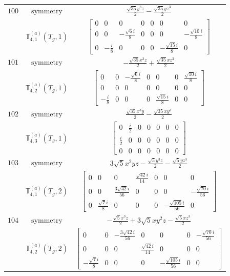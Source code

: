 \documentclass[fleqn,8pt,landscape]{jsarticle}
\begin{document}
\begin{longtable}{ccc}
$ 100 $ & $ \text{symmetry} $ & $ \frac{\sqrt{35} y^{3} z}{2} - \frac{\sqrt{35} y z^{3}}{2} $ \\
$  $ & $ \mathbb{T}_{4,1}^{(a)}(T_{g},1) $ & $ \begin{bmatrix} 0 & 0 & 0 & 0 & 0 & 0 & 0 \\ 0 & 0 & - \frac{\sqrt{6} i}{8} & 0 & 0 & 0 & - \frac{\sqrt{10} i}{8} \\ 0 & - \frac{i}{8} & 0 & 0 & 0 & - \frac{\sqrt{15} i}{8} & 0 \end{bmatrix} $ \\ \hline
$ 101 $ & $ \text{symmetry} $ & $ - \frac{\sqrt{35} x^{3} z}{2} + \frac{\sqrt{35} x z^{3}}{2} $ \\
$  $ & $ \mathbb{T}_{4,2}^{(a)}(T_{g},1) $ & $ \begin{bmatrix} 0 & 0 & - \frac{\sqrt{6} i}{8} & 0 & 0 & 0 & \frac{\sqrt{10} i}{8} \\ 0 & 0 & 0 & 0 & 0 & 0 & 0 \\ - \frac{i}{8} & 0 & 0 & 0 & \frac{\sqrt{15} i}{8} & 0 & 0 \end{bmatrix} $ \\ \hline
$ 102 $ & $ \text{symmetry} $ & $ \frac{\sqrt{35} x^{3} y}{2} - \frac{\sqrt{35} x y^{3}}{2} $ \\
$  $ & $ \mathbb{T}_{4,3}^{(a)}(T_{g},1) $ & $ \begin{bmatrix} 0 & \frac{i}{2} & 0 & 0 & 0 & 0 & 0 \\ \frac{i}{2} & 0 & 0 & 0 & 0 & 0 & 0 \\ 0 & 0 & 0 & 0 & 0 & 0 & 0 \end{bmatrix} $ \\ \hline
$ 103 $ & $ \text{symmetry} $ & $ 3 \sqrt{5} x^{2} y z - \frac{\sqrt{5} y^{3} z}{2} - \frac{\sqrt{5} y z^{3}}{2} $ \\
$  $ & $ \mathbb{T}_{4,1}^{(a)}(T_{g},2) $ & $ \begin{bmatrix} 0 & 0 & 0 & \frac{\sqrt{42} i}{14} & 0 & 0 & 0 \\ 0 & 0 & \frac{3 \sqrt{42} i}{56} & 0 & 0 & 0 & - \frac{\sqrt{70} i}{56} \\ 0 & \frac{\sqrt{7} i}{8} & 0 & 0 & 0 & - \frac{\sqrt{105} i}{56} & 0 \end{bmatrix} $ \\ \hline
$ 104 $ & $ \text{symmetry} $ & $ - \frac{\sqrt{5} x^{3} z}{2} + 3 \sqrt{5} x y^{2} z - \frac{\sqrt{5} x z^{3}}{2} $ \\
$  $ & $ \mathbb{T}_{4,2}^{(a)}(T_{g},2) $ & $ \begin{bmatrix} 0 & 0 & - \frac{3 \sqrt{42} i}{56} & 0 & 0 & 0 & - \frac{\sqrt{70} i}{56} \\ 0 & 0 & 0 & \frac{\sqrt{42} i}{14} & 0 & 0 & 0 \\ - \frac{\sqrt{7} i}{8} & 0 & 0 & 0 & - \frac{\sqrt{105} i}{56} & 0 & 0 \end{bmatrix} $ \\ \hline

\end{longtable}
\end{document}
